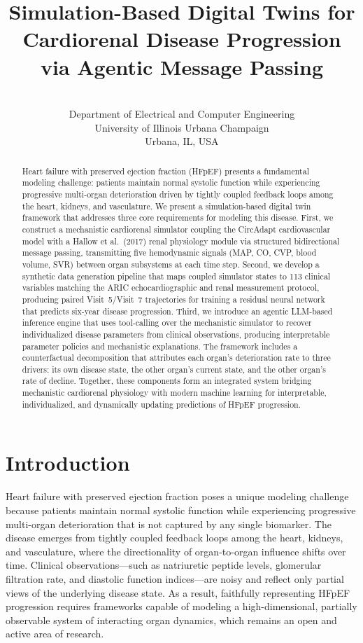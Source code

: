 \documentclass[pmlr]{jmlr}
\title[Simulation-Based Digital Twins for Cardiorenal Disease]{Simulation-Based Digital Twins for Cardiorenal Disease Progression via Agentic Message Passing}
\author{\Name{Pranav Dorbala}
       \Email{dorbala2@illinois.edu}\\
       \addr Department of Electrical and Computer Engineering\\
       University of Illinois Urbana Champaign\\
       Urbana, IL, USA}
\begin{document}
\maketitle

\begin{abstract}
Heart failure with preserved ejection fraction (HFpEF) presents a fundamental modeling challenge: patients maintain normal systolic function while experiencing progressive multi-organ deterioration driven by tightly coupled feedback loops among the heart, kidneys, and vasculature. We present a simulation-based digital twin framework that addresses three core requirements for modeling this disease. First, we construct a mechanistic cardiorenal simulator coupling the CircAdapt cardiovascular model with a Hallow et al.\ (2017) renal physiology module via structured bidirectional message passing, transmitting five hemodynamic signals (MAP, CO, CVP, blood volume, SVR) between organ subsystems at each time step. Second, we develop a synthetic data generation pipeline that maps coupled simulator states to 113 clinical variables matching the ARIC echocardiographic and renal measurement protocol, producing paired Visit~5/Visit~7 trajectories for training a residual neural network that predicts six-year disease progression. Third, we introduce an agentic LLM-based inference engine that uses tool-calling over the mechanistic simulator to recover individualized disease parameters from clinical observations, producing interpretable parameter policies and mechanistic explanations. The framework includes a counterfactual decomposition that attributes each organ's deterioration rate to three drivers: its own disease state, the other organ's current state, and the other organ's rate of decline. Together, these components form an integrated system bridging mechanistic cardiorenal physiology with modern machine learning for interpretable, individualized, and dynamically updating predictions of HFpEF progression.
\end{abstract}

\section{Introduction}

Heart failure with preserved ejection fraction poses a unique modeling challenge because patients maintain normal systolic function while experiencing progressive multi-organ deterioration that is not captured by any single biomarker. The disease emerges from tightly coupled feedback loops among the heart, kidneys, and vasculature, where the directionality of organ-to-organ influence shifts over time. Clinical observations---such as natriuretic peptide levels, glomerular filtration rate, and diastolic function indices---are noisy and reflect only partial views of the underlying disease state. As a result, faithfully representing HFpEF progression requires frameworks capable of modeling a high-dimensional, partially observable system of interacting organ dynamics, which remains an open and active area of research.
\end{document}
